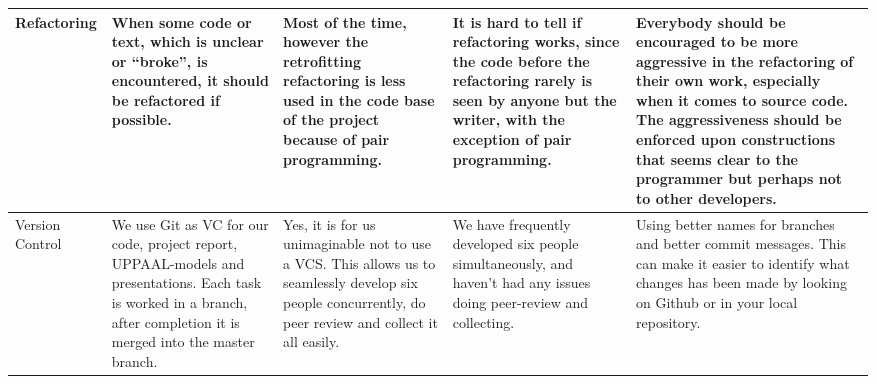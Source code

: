 \begin{sidewaystable}[]
\begin{tabularx}{\textwidth}{|l|X|X|X|X|}
Refactoring      & When some code or text, which is unclear or ``broke'', is encountered, it should be refactored if possible.                                                                                                                  & Most of the time, however the retrofitting refactoring is less used in the code base of the project because of pair programming.                                                                                                                                & It is hard to tell if refactoring works, since the code before the refactoring rarely is seen by anyone but the writer, with the exception of pair programming.                                                                                                                                                                                                                    & Everybody should be encouraged to be more aggressive in the refactoring of their own work, especially when it comes to source code. The aggressiveness should be enforced upon constructions that seems clear to the programmer but perhaps not to other developers.                            \\ \hline
Version Control  & We use Git as VC for our code, project report, UPPAAL-models and presentations. Each task is worked in a branch, after completion it is merged into the master branch.                                                      & Yes, it is for us unimaginable not to use a VCS. This allows us to seamlessly develop six people concurrently, do peer review and collect it all easily.                                                                                                        & We have frequently developed six people simultaneously, and haven't had any issues doing peer-review and collecting.                                                                                                                                                                                                                                                                & Using better names for branches and better commit messages. This can make it easier to identify what changes has been made by looking on Github or in your local repository.                                                                                                                   \\ \hline

\end{tabularx}
\end{sidewaystable}
